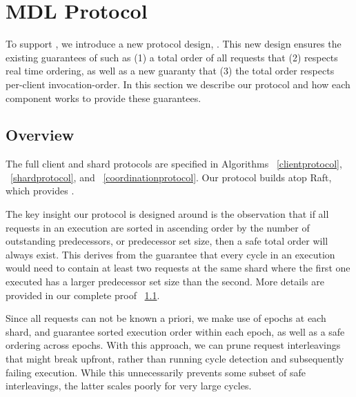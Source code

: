 

\section{MDL Protocol}
\label{sec:design}


To support \mdl, we introduce a new protocol design, \md. This new design ensures the existing guarantees of \sdl such as (1) a total order of all requests that (2) respects real time ordering, as well as a new guaranty that (3) the total order respects per-client invocation-order. In this section we describe our protocol and how each component works to provide these guarantees.

\subsection{Overview}
The full client and shard protocols are specified in Algorithms ~\ref{clientprotocol}, ~\ref{shardprotocol}, and ~\ref{coordinationprotocol}. Our protocol builds atop Raft, which provides \sdl. 

The key insight our protocol is designed around is the observation that if all requests in an execution are sorted in ascending order by the number of outstanding predecessors, or predecessor set size, then a safe total order will always exist. This derives from the guarantee that every cycle in an \md execution would need to contain at least two requests at the same shard where the first one executed has a larger predecessor set size than the second. More details are provided in our complete proof ~\ref{}. 

Since all requests can not be known a priori, we make use of epochs at each shard, and guarantee sorted execution order within each epoch, as well as a safe ordering across epochs. With this approach, we can prune request interleavings that might break \md upfront, rather than running cycle detection and subsequently failing execution. While this unnecessarily prevents some subset of safe interleavings, the latter scales poorly for very large cycles.

